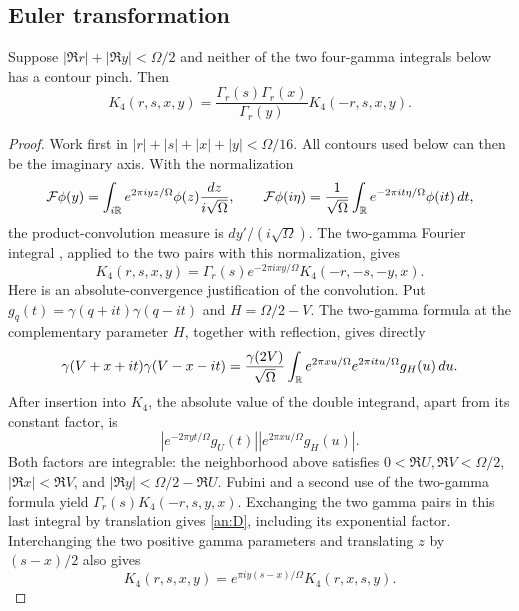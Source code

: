 \subsection{Euler transformation}

\begin{lemma}\label{an:euler}
Suppose $|\Re r|+|\Re y|<\Omega/2$ and neither of the two
four-gamma integrals below has a contour pinch.  Then
\begin{equation}
 K_4(r,s,x,y)=\frac{\Gamma_r(s)\Gamma_r(x)}{\Gamma_r(y)}K_4(-r,s,x,y).
 \label{an:euler-centered}
\end{equation}
\end{lemma}

\begin{proof}
Work first in $|r|+|s|+|x|+|y|<\Omega/16$.  All contours used below
can then be the imaginary axis.  With the normalization
\[
 \mathcal F\phi(y)=\int_{i\mathbb R}e^{2\pi iyz/\Omega}\phi(z)
                                     \frac{dz}{i\sqrt\Omega},
 \qquad
 \mathcal F\phi(i\eta)=\frac1{\sqrt\Omega}
       \int_{\mathbb R}e^{-2\pi it\eta/\Omega}\phi(it)\,dt,
\]
the product-convolution measure is $dy'/(i\sqrt\Omega)$.
The two-gamma Fourier integral \cite[Eq.~(2.17)]{BSS}, applied to
the two pairs with this normalization, gives
\begin{equation}
 K_4(r,s,x,y)=\Gamma_r(s)e^{-2\pi ixy/\Omega}K_4(-r,-s,-y,x).
 \label{an:D}
\end{equation}
Here is an absolute-convergence justification of the convolution.
Put $g_q(t)=\gamma(q+it)\gamma(q-it)$ and $H=\Omega/2-V$.
The two-gamma formula at the complementary parameter $H$, together
with reflection, gives directly
\[
 \gamma(V+x+it)\gamma(V-x-it)
 =\frac{\gamma(2V)}{\sqrt\Omega}
   \int_{\mathbb R}e^{2\pi xu/\Omega}e^{2\pi itu/\Omega}g_H(u)\,du.
\]
After insertion into $K_4$, the absolute value of the double integrand,
apart from its constant factor, is
\[
 \left|e^{-2\pi yt/\Omega}g_U(t)\right|
 \left|e^{2\pi xu/\Omega}g_H(u)\right|.
\]
Both factors are integrable: the neighborhood above satisfies
$0<\Re U,\Re V<\Omega/2$, $|\Re x|<\Re V$, and
$|\Re y|<\Omega/2-\Re U$.  Fubini and a second use of the two-gamma
formula yield $\Gamma_r(s)K_4(-r,s,y,x)$.
Exchanging the two gamma pairs in this last integral by translation
gives \eqref{an:D}, including its exponential factor.
Interchanging the two positive gamma parameters and translating $z$
by $(s-x)/2$ also gives
\begin{equation}
 K_4(r,s,x,y)=e^{\pi iy(s-x)/\Omega}K_4(r,x,s,y).
 \label{an:P}

\end{equation}
\end{proof}
